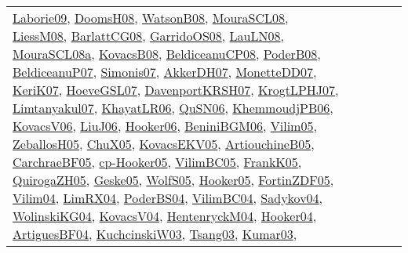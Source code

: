 {\begin{longtable}{lp{3cm}>{\raggedright}p{6cm}>{\raggedright}p{6cm}p{8cm}}
\href{papers/Laborie09.pdf}{Laborie09}\cite{Laborie09}, \href{papers/DoomsH08.pdf}{DoomsH08}\cite{DoomsH08}, \href{papers/WatsonB08.pdf}{WatsonB08}\cite{WatsonB08}, \href{papers/MouraSCL08.pdf}{MouraSCL08}\cite{MouraSCL08}, \href{articles/LiessM08.pdf}{LiessM08}\cite{LiessM08}, \href{papers/BarlattCG08.pdf}{BarlattCG08}\cite{BarlattCG08}, \href{articles/GarridoOS08.pdf}{GarridoOS08}\cite{GarridoOS08}, \href{papers/LauLN08.pdf}{LauLN08}\cite{LauLN08}, \href{papers/MouraSCL08a.pdf}{MouraSCL08a}\cite{MouraSCL08a}, \href{articles/KovacsB08.pdf}{KovacsB08}\cite{KovacsB08}, \href{papers/BeldiceanuCP08.pdf}{BeldiceanuCP08}\cite{BeldiceanuCP08}, \href{papers/PoderB08.pdf}{PoderB08}\cite{PoderB08}, \href{papers/BeldiceanuP07.pdf}{BeldiceanuP07}\cite{BeldiceanuP07}, \href{articles/Simonis07.pdf}{Simonis07}\cite{Simonis07}, \href{papers/AkkerDH07.pdf}{AkkerDH07}\cite{AkkerDH07}, \href{papers/MonetteDD07.pdf}{MonetteDD07}\cite{MonetteDD07}, \href{papers/KeriK07.pdf}{KeriK07}\cite{KeriK07}, \href{papers/HoeveGSL07.pdf}{HoeveGSL07}\cite{HoeveGSL07}, \href{papers/DavenportKRSH07.pdf}{DavenportKRSH07}\cite{DavenportKRSH07}, \href{papers/KrogtLPHJ07.pdf}{KrogtLPHJ07}\cite{KrogtLPHJ07}, \href{papers/Limtanyakul07.pdf}{Limtanyakul07}\cite{Limtanyakul07}, \href{articles/KhayatLR06.pdf}{KhayatLR06}\cite{KhayatLR06}, \href{papers/QuSN06.pdf}{QuSN06}\cite{QuSN06}, \href{papers/KhemmoudjPB06.pdf}{KhemmoudjPB06}\cite{KhemmoudjPB06}, \href{papers/KovacsV06.pdf}{KovacsV06}\cite{KovacsV06}, \href{papers/LiuJ06.pdf}{LiuJ06}\cite{LiuJ06}, \href{articles/Hooker06.pdf}{Hooker06}\cite{Hooker06}, \href{papers/BeniniBGM06.pdf}{BeniniBGM06}\cite{BeniniBGM06}, \href{papers/Vilim05.pdf}{Vilim05}\cite{Vilim05}, \href{articles/ZeballosH05.pdf}{ZeballosH05}\cite{ZeballosH05}, \href{papers/ChuX05.pdf}{ChuX05}\cite{ChuX05}, \href{papers/KovacsEKV05.pdf}{KovacsEKV05}\cite{KovacsEKV05}, \href{papers/ArtiouchineB05.pdf}{ArtiouchineB05}\cite{ArtiouchineB05}, \href{papers/CarchraeBF05.pdf}{CarchraeBF05}\cite{CarchraeBF05}, \href{papers/cp-Hooker05.pdf}{cp-Hooker05}\cite{cp-Hooker05}, \href{articles/VilimBC05.pdf}{VilimBC05}\cite{VilimBC05}, \href{papers/FrankK05.pdf}{FrankK05}\cite{FrankK05}, \href{papers/QuirogaZH05.pdf}{QuirogaZH05}\cite{QuirogaZH05}, \href{papers/Geske05.pdf}{Geske05}\cite{Geske05}, \href{papers/WolfS05.pdf}{WolfS05}\cite{WolfS05}, \href{articles/Hooker05.pdf}{Hooker05}\cite{Hooker05}, \href{papers/FortinZDF05.pdf}{FortinZDF05}\cite{FortinZDF05}, \href{papers/Vilim04.pdf}{Vilim04}\cite{Vilim04}, \href{papers/LimRX04.pdf}{LimRX04}\cite{LimRX04}, \href{articles/PoderBS04.pdf}{PoderBS04}\cite{PoderBS04}, \href{papers/VilimBC04.pdf}{VilimBC04}\cite{VilimBC04}, \href{papers/Sadykov04.pdf}{Sadykov04}\cite{Sadykov04}, \href{papers/WolinskiKG04.pdf}{WolinskiKG04}\cite{WolinskiKG04}, \href{papers/KovacsV04.pdf}{KovacsV04}\cite{KovacsV04}, \href{papers/HentenryckM04.pdf}{HentenryckM04}\cite{HentenryckM04}, \href{papers/Hooker04.pdf}{Hooker04}\cite{Hooker04}, \href{papers/ArtiguesBF04.pdf}{ArtiguesBF04}\cite{ArtiguesBF04}, \href{articles/KuchcinskiW03.pdf}{KuchcinskiW03}\cite{KuchcinskiW03}, \href{articles/Tsang03.pdf}{Tsang03}\cite{Tsang03}, \href{papers/Kumar03.pdf}{Kumar03}\cite{Kumar03}, 
\end{longtable}}
